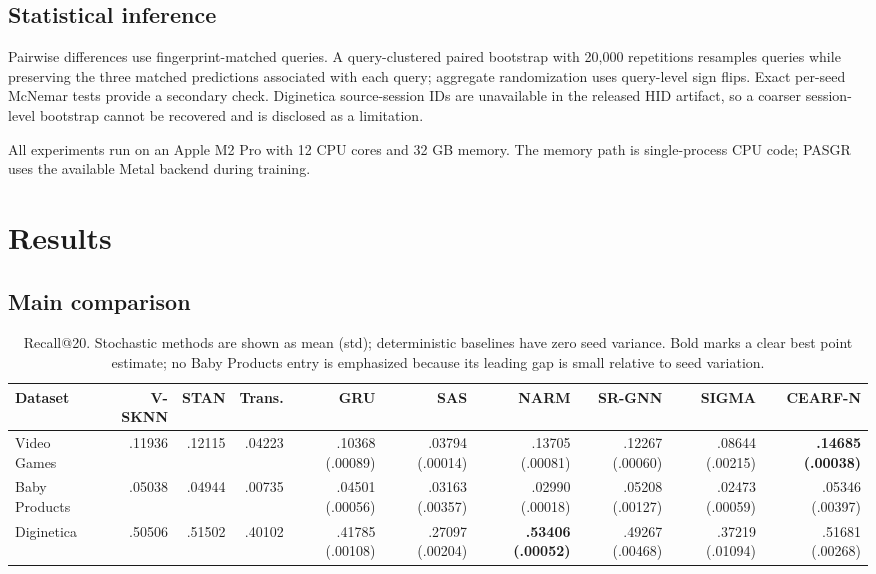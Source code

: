 \documentclass[runningheads]{llncs}
\newcommand{\method}{CEARF-N}
\begin{document}
\subsection{Statistical inference}
Pairwise differences use fingerprint-matched queries. A query-clustered paired
bootstrap with 20,000 repetitions resamples queries while preserving the three
matched predictions associated with each query; aggregate randomization uses
query-level sign flips. Exact per-seed McNemar tests provide a secondary
check. Diginetica source-session IDs are unavailable in the released HID
artifact, so a coarser session-level bootstrap cannot be recovered and is
disclosed as a limitation.

All experiments run on an Apple M2 Pro with 12 CPU cores and 32 GB memory.
The memory path is single-process CPU code; PASGR uses the available Metal
backend during training.

\section{Results}
\subsection{Main comparison}
\begin{table}[t]
\caption{Recall@20. Stochastic methods are shown as mean (std); deterministic
baselines have zero seed variance. Bold marks a clear best point estimate; no
Baby Products entry is emphasized because its leading gap is small relative
to seed variation.}
\label{tab:main}\centering\scriptsize
\setlength{\tabcolsep}{2.2pt}
\begin{tabular}{lrrrrrrrrr}
\toprule
Dataset & V-SKNN & STAN & Trans. & GRU & SAS & NARM & SR-GNN & SIGMA & \method{} \\
\midrule
Video Games & .11936 & .12115 & .04223 & .10368 (.00089) & .03794 (.00014) & .13705 (.00081) & .12267 (.00060) & .08644 (.00215) & \textbf{.14685 (.00038)} \\
Baby Products & .05038 & .04944 & .00735 & .04501 (.00056) & .03163 (.00357) & .02990 (.00018) & .05208 (.00127) & .02473 (.00059) & .05346 (.00397) \\
Diginetica & .50506 & .51502 & .40102 & .41785 (.00108) & .27097 (.00204) & \textbf{.53406 (.00052)} & .49267 (.00468) & .37219 (.01094) & .51681 (.00268) \\
\bottomrule
\end{tabular}
\end{table}
\end{document}
